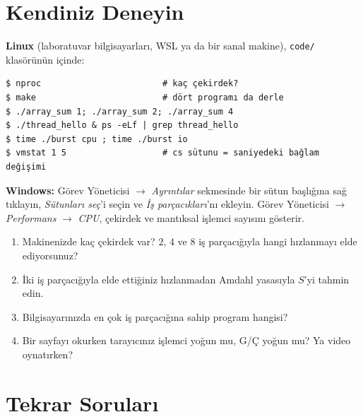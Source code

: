 \section{Kendiniz Deneyin}

\begin{tryit}
\textbf{Linux} (laboratuvar bilgisayarları, WSL ya da bir sanal makine), \texttt{code/} klasörünün içinde:
\begin{lstlisting}[style=term]
$ nproc                        # kaç çekirdek?
$ make                         # dört programı da derle
$ ./array_sum 1; ./array_sum 2; ./array_sum 4
$ ./thread_hello & ps -eLf | grep thread_hello
$ time ./burst cpu ; time ./burst io
$ vmstat 1 5                   # cs sütunu = saniyedeki bağlam değişimi
\end{lstlisting}
\textbf{Windows:} Görev Yöneticisi $\to$ \emph{Ayrıntılar} sekmesinde bir sütun başlığına sağ tıklayın, \emph{Sütunları seç}'i seçin ve \emph{İş parçacıkları}'nı ekleyin. Görev Yöneticisi $\to$ \emph{Performans} $\to$ \emph{CPU}, çekirdek ve mantıksal işlemci sayısını gösterir.
\begin{enumerate}[leftmargin=1.4em]
  \item Makinenizde kaç çekirdek var? $2$, $4$ ve $8$ iş parçacığıyla hangi hızlanmayı elde ediyorsunuz?
  \item İki iş parçacığıyla elde ettiğiniz hızlanmadan Amdahl yasasıyla $S$'yi tahmin edin.
  \item Bilgisayarınızda en çok iş parçacığına sahip program hangisi?
  \item Bir sayfayı okurken tarayıcınız işlemci yoğun mu, G/Ç yoğun mu? Ya video oynatırken?
\end{enumerate}
\end{tryit}

\section{Tekrar Soruları}

